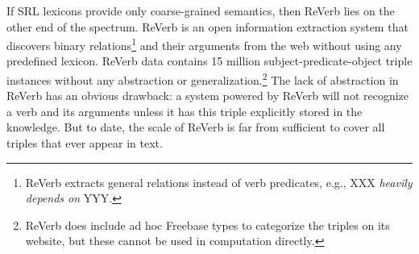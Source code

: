 
If SRL lexicons provide only coarse-grained semantics, then
ReVerb \cite{FaderSE11} lies on the other end of the spectrum.
ReVerb is an open information extraction system that discovers
binary relations\footnote{ReVerb extracts general relations
instead of verb predicates,
e.g., XXX {\em heavily depends on} YYY.}
and their arguments from the web without using any predefined
lexicon.
ReVerb data contains 15 million subject-predicate-object triple
instances without any abstraction or generalization.\footnote{ReVerb
does include ad hoc Freebase \cite{freebase}
types to categorize the triples on its website, but these
cannot be used in computation directly.}
The lack of abstraction in ReVerb has
an obvious drawback: a system powered by ReVerb will not recognize a
verb and its arguments unless it has this triple explicitly stored
in the knowledge. But to date, the scale of ReVerb is far from sufficient
to cover all triples that ever appear in text.

